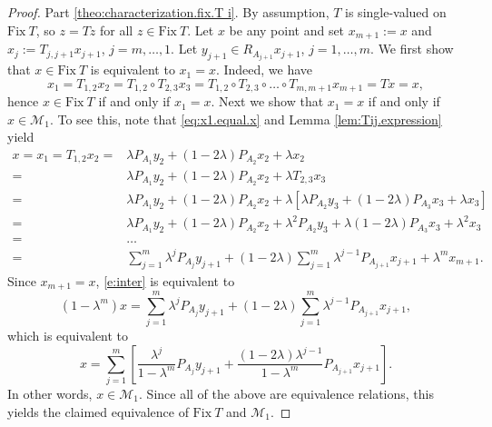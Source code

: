 \documentclass[12pt]{article}
\theoremstyle{definition}
\newcommand{\Fix}{\mathrm{Fix}\ }
\begin{document}
\begin{proof}
Part \eqref{theo:characterization.fix.T i}.
By assumption, $T$ is single-valued on $\Fix T$,
so $z=Tz$ for all $z\in \Fix T$. Let $x$ be any point and set $x_{m+1}:=x$ and
$x_j:=T_{j,j+1}x_{j+1}$, $j=m,\dots,1$.  Let $y_{j+1}\in R_{A_{j+1} }x_{j+1}$, $j=1,\dots,m$.
We first show that $x\in\Fix T$ is equivalent to $x_1=x$. Indeed, we have
\begin{equation}\label{eq:x1.equal.x}
    x_1=T_{1,2}x_2=T_{1,2}\circ T_{2,3}x_3=T_{1,2}\circ T_{2,3}\circ\dots\circ T_{m,m+1}x_{m+1}=Tx=x,
\end{equation}
hence $x\in\Fix T$ if and only if $x_1=x$.
Next we show that $x_1=x$ if and only if $x\in \mathcal{M}_1$.  To see this, note that \eqref{eq:x1.equal.x} and Lemma \ref{lem:Tij.expression} yield
\begin{equation}\label{e:inter}
    \begin{array}{rl}
         x=x_1=T_{1,2}x_2
         =& \lambda P_{A_1}y_2+(1-2\lambda)P_{A_2}x_2+\lambda x_2\\
         =& \lambda P_{A_1}y_2+(1-2\lambda)P_{A_2}x_2+\lambda T_{2,3}x_3\\
         =&\lambda P_{A_1}y_2 + (1-2\lambda)P_{A_2}x_2 +\lambda[\lambda P_{A_2}y_3+(1-2\lambda)P_{A_3}x_3+\lambda x_3]\\
         =&\lambda P_{A_1}y_2+ (1-2\lambda)P_{A_2}x_2+\lambda^2 P_{A_2}y_3+\lambda(1-2\lambda)P_{A_3}x_3+\lambda^2 x_3\\
         =&\dots\\
         =&
         \sum_{j=1}^m \lambda^jP_{A_j}y_{j+1}+(1-2\lambda)\sum_{j=1}^m \lambda^{j-1}P_{A_{j+1}}x_{j+1}+\lambda^mx_{m+1}.
    \end{array}
\end{equation}
Since $x_{m+1}=x$, \eqref{e:inter} is equivalent to
\begin{equation}\label{eq:.x}
    (1-\lambda^m)x=\sum_{j=1}^m \lambda^jP_{A_j}y_{j+1}+(1-2\lambda)\sum_{j=1}^m \lambda^{j-1}P_{A_{j+1}}x_{j+1},
\end{equation}
which is equivalent to
\begin{equation}
    x=\sum_{j=1}^m\left[ \frac{\lambda^j}{1-\lambda^m}P_{A_j}y_{j+1}+  \frac{(1-2\lambda)\lambda^{j-1}}{1-\lambda^m}P_{A_{j+1}}x_{j+1}\right].
\end{equation}
In other words, $x\in\mathcal{M}_1$.  Since all of the above are equivalence relations, this yields the claimed equivalence of $\Fix T$ and $\mathcal{M}_1$.


\end{proof}
\end{document}
